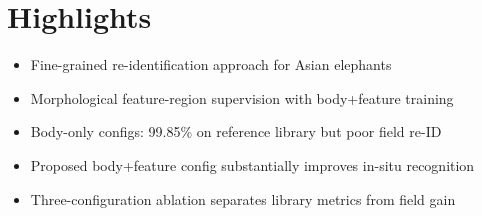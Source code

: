
\section*{Highlights}
\begin{itemize}
  \item Fine-grained re-identification approach for Asian elephants
  \item Morphological feature-region supervision with body+feature training
  \item Body-only configs: 99.85\% on reference library but poor field re-ID
  \item Proposed body+feature config substantially improves in-situ recognition
  \item Three-configuration ablation separates library metrics from field gain
\end{itemize}
